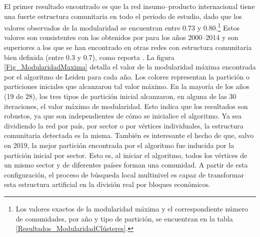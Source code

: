 El primer resultado encontrado es que la red insumo--producto internacional tiene una fuerte estructura comunitaria en todo el periodo de estudio, dado que los valores observados de la modularidad se encuentran entre 0.73 y 0.80.\footnote{Los valores exactos de la modularidad máxima y el correspondiente número de comunidades, por año y tipo de partición, se encuentran en la tabla \ref{Resultados_ModularidadClústeres}.} Estos valores son consistentes con los obtenidos por \textcite{Kireyev2022} para los años 2000--2014 y son superiores a los que se han encontrado en otras redes con estructura comunitaria bien definida (entre 0.3 y 0.7), como reporta \textcite[p.~7]{Newman2004}. La figura \ref{Fig_ModularidadMaxima} detalla el valor de la modularidad máxima encontrada por el algoritmo de Leiden para cada año. Los colores representan la partición o particiones iniciales que alcanzaron tal valor máximo. En la mayoría de los años (19 de 28), los tres tipos de partición inicial alcanzaron, en alguna de las 30 iteraciones, el valor máximo de modularidad. Esto indica que los resultados son robustos, ya que son independientes de cómo se inicialice el algoritmo. Ya sea dividiendo la red por país, por sector o por vértices individuales, la estructura comunitaria detectada es la misma. También es interesante el hecho de que, salvo en 2019, la mejor partición encontrada por el algoritmo fue inducida por la partición inicial por sector. Esto es, al iniciar el algoritmo, todos los vértices de un mismo sector y de diferentes países forman una comunidad. A partir de esta configuración, el proceso de búsqueda local multinivel es capaz de transformar esta estructura artificial en la división real por bloques económicos.

